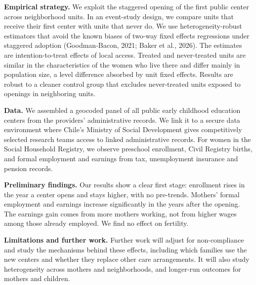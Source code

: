 \documentclass[11pt]{article}
\begin{document}
\textbf{Empirical strategy.} We exploit the staggered opening of the first public center across neighborhood units. In an event-study design, we compare units that receive their first center with units that never do. We use heterogeneity-robust estimators that avoid the known biases of two-way fixed effects regressions under staggered adoption (Goodman-Bacon, 2021; Baker et al., 2026). The estimates are intention-to-treat effects of local access. Treated and never-treated units are similar in the characteristics of the women who live there and differ mainly in population size, a level difference absorbed by unit fixed effects. Results are robust to a cleaner control group that excludes never-treated units exposed to openings in neighboring units.

\textbf{Data.} We assembled a geocoded panel of all public early childhood education centers from the providers' administrative records. We link it to a secure data environment where Chile's Ministry of Social Development gives competitively selected research teams access to linked administrative records. For women in the Social Household Registry, we observe preschool enrollment, Civil Registry births, and formal employment and earnings from tax, unemployment insurance and pension records.

\textbf{Preliminary findings.} Our results show a clear first stage: enrollment rises in the year a center opens and stays higher, with no pre-trends. Mothers' formal employment and earnings increase significantly in the years after the opening. The earnings gain comes from more mothers working, not from higher wages among those already employed. We find no effect on fertility.

\textbf{Limitations and further work.} Further work will adjust for non-compliance and study the mechanisms behind these effects, including which families use the new centers and whether they replace other care arrangements. It will also study heterogeneity across mothers and neighborhoods, and longer-run outcomes for mothers and children.
\end{document}
